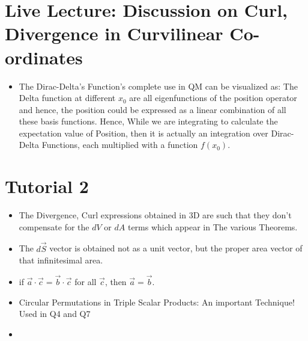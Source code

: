 \documentclass{article}
\begin{document}
\section{Live Lecture: Discussion on Curl, Divergence in Curvilinear Co-ordinates}

\begin{itemize}
  \item The Dirac-Delta's Function's complete use in QM can be visualized as: The Delta function at different $x_0$ are all eigenfunctions of the position operator and hence, the position could be expressed as a linear combination of all these basis functions. Hence, While we are integrating to calculate the expectation value of Position, then it is actually an integration over Dirac-Delta Functions, each multiplied with a function $f(x_0)$.

\end{itemize}

\section{Tutorial 2}

\begin{itemize}
  \item The Divergence, Curl expressions obtained in 3D are such that they don't compensate for the $dV$ or $dA$ terms which appear in The various Theorems.
  \item The $d\vec{S}$ vector is obtained not as a unit vector, but the proper area vector of that infinitesimal area.
  \item if $\vec{a} \cdot \vec{c} = \vec{b} \cdot \vec{c}$ for all $\vec{c}$, then $\vec{a} = \vec{b}$.
  \item Circular Permutations in Triple Scalar Products: An important Technique! Used in Q4 and Q7
  \item 
\end{itemize}
\end{document}
